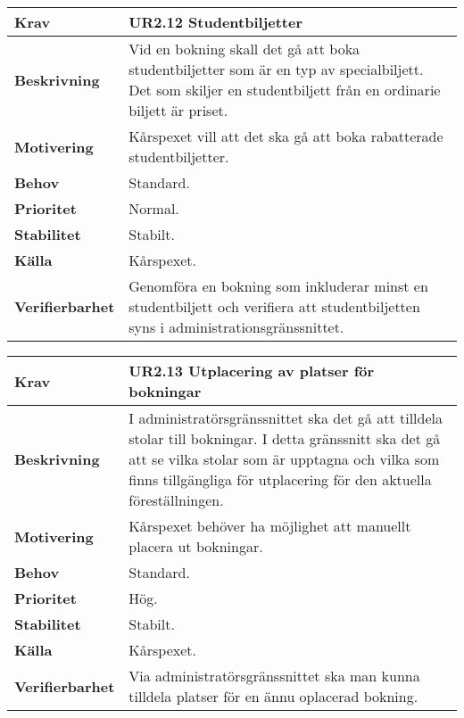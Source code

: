 \documentclass[a4paper, twoside, 11pt, titlepage]{article}
\begin{document}
		\begin{tabular} { p{2.6cm} p{12.5cm} }
			\hline
			\sffamily\textbf{Krav} & \sffamily\textbf{UR2.12 Studentbiljetter  } \\
			\hline
			\sffamily\textbf{Beskrivning} & Vid en bokning skall det gå att boka studentbiljetter som är en typ av specialbiljett. Det som skiljer en studentbiljett från en ordinarie biljett är priset.  \\
			\hline
			\sffamily\textbf{Motivering} & Kårspexet vill att det ska gå att boka rabatterade studentbiljetter.  \\
			\hline
			\sffamily\textbf{Behov} & Standard.  \\
			\hline
			\sffamily\textbf{Prioritet} & Normal.  \\
			\hline
			\sffamily\textbf{Stabilitet} & Stabilt.  \\
			\hline
			\sffamily\textbf{Källa} & Kårspexet.  \\
			\hline
			\sffamily\textbf{Verifierbarhet} & Genomföra en bokning som inkluderar minst en studentbiljett och verifiera att studentbiljetten syns i administrationsgränssnittet.  \\
			\hline
		\end{tabular}
		\vspace{6mm}

		\begin{tabular} { p{2.6cm} p{12.5cm} }
			\hline
			\sffamily\textbf{Krav} & \sffamily\textbf{UR2.13 Utplacering av platser för bokningar  } \\
			\hline
			\sffamily\textbf{Beskrivning} & I administratörsgränssnittet ska det gå att tilldela stolar till bokningar. I detta gränssnitt ska det gå att se vilka stolar som är upptagna och vilka som finns tillgängliga för utplacering för den aktuella föreställningen.  \\
			\hline
			\sffamily\textbf{Motivering} & Kårspexet behöver ha möjlighet att manuellt placera ut bokningar.  \\
			\hline
			\sffamily\textbf{Behov} & Standard.  \\
			\hline
			\sffamily\textbf{Prioritet} & Hög.  \\
			\hline
			\sffamily\textbf{Stabilitet} & Stabilt.  \\
			\hline
			\sffamily\textbf{Källa} & Kårspexet.  \\
			\hline
			\sffamily\textbf{Verifierbarhet} & Via administratörsgränssnittet ska man kunna tilldela platser för en ännu oplacerad bokning.  \\
			\hline
		\end{tabular}
		\vspace{6mm}
\end{document}
